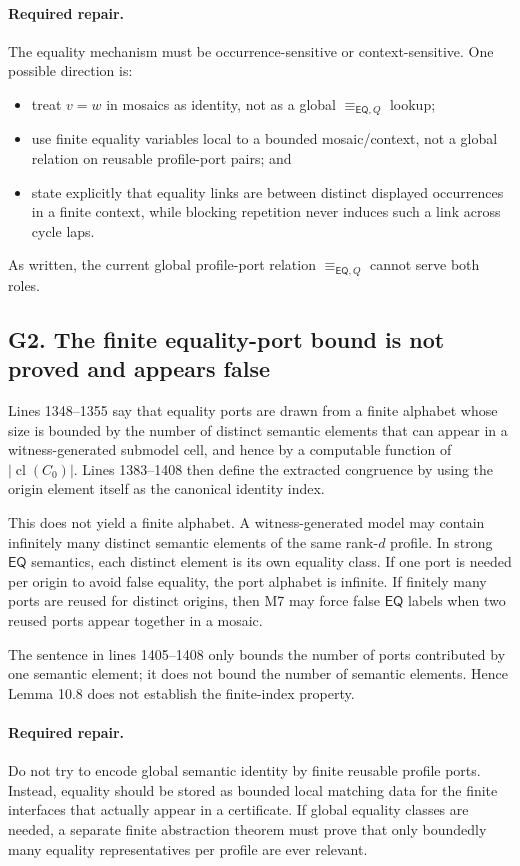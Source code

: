 \documentclass[11pt]{article}
\newcommand{\EQ}{\mathsf{EQ}}
\newcommand{\cl}{\operatorname{cl}}
\newcommand{\eqQ}{\equiv_{\EQ,Q}}
\begin{document}
\paragraph{Required repair.}
The equality mechanism must be occurrence-sensitive or context-sensitive.  One
possible direction is:
\begin{itemize}
\item treat \(v=w\) in mosaics as identity, not as a global \(\eqQ\) lookup;
\item use finite equality variables local to a bounded mosaic/context, not a
global relation on reusable profile-port pairs; and
\item state explicitly that equality links are between distinct displayed
occurrences in a finite context, while blocking repetition never induces such a
link across cycle laps.
\end{itemize}
As written, the current global profile-port relation \(\eqQ\) cannot serve both
roles.

\subsection{G2. The finite equality-port bound is not proved and appears false}

Lines 1348--1355 say that equality ports are drawn from a finite alphabet whose
size is bounded by the number of distinct semantic elements that can appear in
a witness-generated submodel cell, and hence by a computable function of
\(|\cl(C_0)|\).  Lines 1383--1408 then define the extracted congruence by using
the origin element itself as the canonical identity index.

This does not yield a finite alphabet.  A witness-generated model may contain
infinitely many distinct semantic elements of the same rank-\(d\) profile.  In
strong \(\EQ\) semantics, each distinct element is its own equality class.  If
one port is needed per origin to avoid false equality, the port alphabet is
infinite.  If finitely many ports are reused for distinct origins, then M7 may
force false \(\EQ\) labels when two reused ports appear together in a mosaic.

The sentence in lines 1405--1408 only bounds the number of ports contributed by
one semantic element; it does not bound the number of semantic elements.  Hence
Lemma 10.8 does not establish the finite-index property.

\paragraph{Required repair.}
Do not try to encode global semantic identity by finite reusable profile ports.
Instead, equality should be stored as bounded local matching data for the finite
interfaces that actually appear in a certificate.  If global equality classes
are needed, a separate finite abstraction theorem must prove that only boundedly
many equality representatives per profile are ever relevant.
\end{document}
